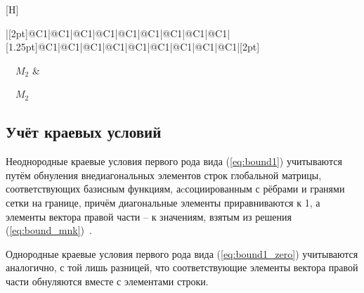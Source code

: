 \documentclass[a4paper,14pt]{article}
\makeatletter
\renewenvironment{figure}[1][\fps@figure]{
  \edef\@tempa{\noexpand\@float{figure}[#1]}
  \@tempa
  \addtocounter{foofigure}{1}
}{
  \end@float
}
\makeatother
\begin{document}
\begin{figure}[H]
\begin{spacing}{0.75}
\begin{tabu}{|[2pt]@{}C{1}|@{}C{1}|@{}C{1}|@{}C{1}|@{}C{1}|@{}C{1}|@{}C{1}|@{}C{1}|@{}C{1}|[1.25pt]@{}C{1}|@{}C{1}|@{}C{1}|@{}C{1}|@{}C{1}|@{}C{1}|@{}C{1}|@{}C{1}|@{}C{1}|[2pt]}
			~\vspace{-1ex}\par~~\small $\scriptscriptstyle M_{2}$ &
			~\vspace{-1ex}\par~~\small $\scriptscriptstyle M_{2}$
		\\[0.25ex]\tabucline[2pt]{-}
	\end{tabu}
	\end{spacing}
	\vspace{1ex}
	\caption{структура СЛАУ}
	\label{fig:theory:matrx_structure}
\end{figure}


\subsection{Учёт краевых условий}



Неоднородные краевые условия первого рода вида (\ref{eq:bound1}) учитываются путём обнуления внедиагональных элементов строк глобальной матрицы, соответствующих базисным функциям, аcсоциированным с рёбрами и гранями сетки на границе, причём диагональные элементы приравниваются к 1, а элементы вектора правой части -- к значениям, взятым из решения (\ref{eq:bound_mnk})~\citep{balandin_slae}.

Однородные краевые условия первого рода вида (\ref{eq:bound1_zero}) учитываются аналогично, с той лишь разницей, что соответствующие элементы вектора правой части обнуляются вместе с элементами строки.
\end{document}
